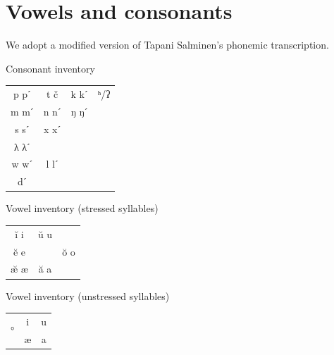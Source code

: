\documentclass[a4paper, 12pt]{article}
\begin{document}
\begin{figure}[H]
	\end{figure}

		\section{Vowels and consonants}
		
	We adopt a modified version of Tapani Salminen's phonemic transcription.\\

\begin{minipage}{.45\textwidth}
\noindent Consonant inventory
\begin{table}[H]
\begin{tabular}{cccc}
p pˊ & t č  & k kˊ & ʰ/ʔ \\
m mˊ & n nˊ & ŋ ŋˊ &     \\
s sˊ & x xˊ &      &     \\
λ λˊ &      &      &     \\
w wˊ & l lˊ &      &     \\
dˊ   &      &      &    
\end{tabular}
\end{table}
\end{minipage}
\vspace*{1em}
\hfill
\begin{minipage}{.45\textwidth}
Vowel inventory (stressed syllables)

\begin{table}[H]
\begin{tabular}{ccc}
ĭ i  & ŭ u &     \\
ĕ e  &    & ŏ o \\
æ̆ æ & ă a &    
\end{tabular}
\end{table}
\end{minipage}
\begin{center}
\begin{minipage}{.5\textwidth}
Vowel inventory (unstressed syllables)

\begin{table}[H]
\begin{tabular}{ccc}
\multirow{2}{*}{°} & i & u \\
                   & æ & a
\end{tabular}
\end{table}
\end{minipage}
\end{center}
		
\end{document}
